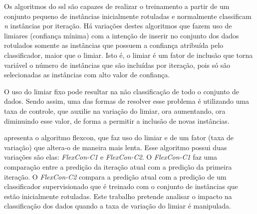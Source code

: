     
    Os algoritmos do \ac{ssl} são capazes de realizar o treinamento a partir de um conjunto pequeno de instâncias inicialmente rotuladas e normalmente classificam \textit{n} instâncias por iteração. Há variações destes algoritmos que fazem uso de limiares (confiança mínima) com a intenção de inserir no conjunto dos dados rotulados somente as instâncias que possuem a confiança atribuída pelo classificador, maior que o limiar. Isto é, o limiar é um fator de inclusão que torna variável o número de instâncias que são incluídas por iteração, pois só são selecionadas as instâncias com alto valor de confiança.
    
    
    O uso do limiar fixo pode resultar na não classificação de todo o conjunto de dados. Sendo assim, uma das formas de resolver esse problema é utilizando uma taxa de controle, que auxilie na variação do limiar, ora aumentando, ora diminuindo esse valor, de forma a permitir a inclusão de novas instâncias.
    
    
     apresenta o algoritmo \ac{flexcon}, que faz uso do limiar e de um fator (taxa de variação) que altera\hyp{o} de maneira mais lenta. Esse algoritmo possui duas variações são elas: \textit{FlexCon\hyp{C1}} e \textit{FlexCon\hyp{C2}}. O \textit{FlexCon\hyp{C1}} faz uma comparação entre a predição da iteração atual com a predição da primeira iteração. O \textit{FlexCon\hyp{C2}} compara a predição atual com a predição de um classificador supervisionado que é treinado com o conjunto de instâncias que estão inicialmente rotuladas. Este trabalho pretende analisar o impacto na classificação dos dados quando a taxa de variação do limiar é manipulada.
    
